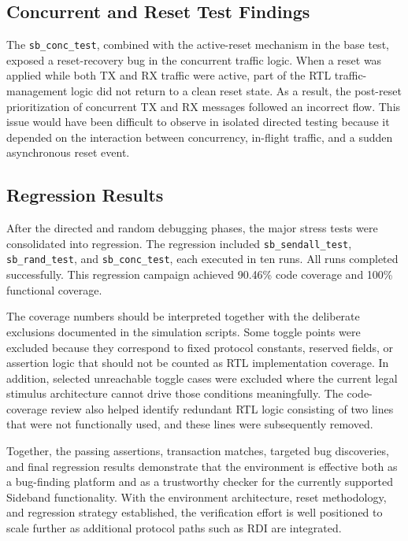 
\subsection{Concurrent and Reset Test Findings}
The \texttt{sb\_conc\_test}, combined with the active-reset mechanism in the base test, exposed a reset-recovery bug in the concurrent traffic logic. When a reset was applied while both TX and RX traffic were active, part of the RTL traffic-management logic did not return to a clean reset state. As a result, the post-reset prioritization of concurrent TX and RX messages followed an incorrect flow. This issue would have been difficult to observe in isolated directed testing because it depended on the interaction between concurrency, in-flight traffic, and a sudden asynchronous reset event.


\subsection{Regression Results}
After the directed and random debugging phases, the major stress tests were consolidated into regression. The regression included \texttt{sb\_sendall\_test}, \texttt{sb\_rand\_test}, and \texttt{sb\_conc\_test}, each executed in ten runs. All runs completed successfully. This regression campaign achieved 90.46\% code coverage and 100\% functional coverage.

The coverage numbers should be interpreted together with the deliberate exclusions documented in the simulation scripts. Some toggle points were excluded because they correspond to fixed protocol constants, reserved fields, or assertion logic that should not be counted as RTL implementation coverage. In addition, selected unreachable toggle cases were excluded where the current legal stimulus architecture cannot drive those conditions meaningfully. The code-coverage review also helped identify redundant RTL logic consisting of two lines that were not functionally used, and these lines were subsequently removed.


Together, the passing assertions, transaction matches, targeted bug discoveries, and final regression results demonstrate that the environment is effective both as a bug-finding platform and as a trustworthy checker for the currently supported Sideband functionality. With the environment architecture, reset methodology, and regression strategy established, the verification effort is well positioned to scale further as additional protocol paths such as RDI are integrated.
